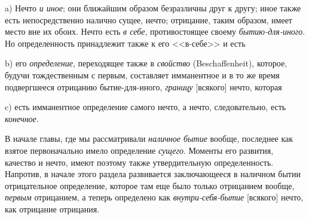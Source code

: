 a) Нечто \emph{и иное}; они ближайшим образом безразличны
друг к другу; иное также есть непосредственно налично
сущее, нечто; отрицание, таким образом, имеет место
вне их обоих. Нечто есть \emph{в себе}, противостоящее своему
\emph{бытию-для-иного}. Но определенность принадлежит также
к его <<в-себе>> и есть

b) его \emph{определение}, переходящее также в \emph{свойство}
(Beschaffenheit), которое, будучи тождественным с первым,
составляет имманентное и в то же время подвергшееся
отрицанию бытие-для-иного, \emph{границу} [всякого]
нечто, которая

c) есть имманентное определение самого нечто, а нечто,
следовательно, есть \emph{конечное}.

В начале главы, где мы рассматривали \emph{наличное
бытие} вообще, последнее как взятое первоначально имело
определение \emph{сущего}. Моменты его развития, качество
и нечто, имеют поэтому также утвердительную определенность.
Напротив, в начале этого раздела развивается
заключающееся в наличном бытии отрицательное определение,
которое там еще было только отрицанием вообще,
\emph{первым} отрицанием, а теперь определено как \emph{внутри-себя-бытие}
[всякого] нечто, как отрицание отрицания.



